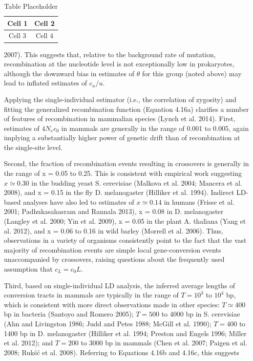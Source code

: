 \documentclass{article}
\begin{document}
\begin{table}[h]
\centering
\begin{tabular}{|c|c|}
\hline
Cell 1 & Cell 2 \\
\hline
Cell 3 & Cell 4 \\
\hline
\end{tabular}
\caption{Table Placeholder}
\end{table}

2007). This suggests that, relative to the background rate of mutation, recombination at the nucleotide level is not exceptionally low in prokaryotes, although the downward bias in estimates of  $ \theta $ for this group (noted above) may lead to inflated estimates of  $ c_n/u $.

Applying the single-individual estimator (i.e., the correlation of zygosity) and fitting the generalized recombination function (Equation 4.16a) clarifies a number of features of recombination in mammalian species (Lynch et al. 2014). First, estimates of  $ 4N_{e}c_{0} $ in mammals are generally in the range of 0.001 to 0.005, again implying a substantially higher power of genetic drift than of recombination at the single-site level.

Second, the fraction of recombination events resulting in crossovers is generally in the range of x = 0.05 to 0.25. This is consistent with empirical work suggesting  $ x \simeq 0.30 $ in the budding yeast S. cerevisiae (Malkova et al. 2004; Mancera et al. 2008), and x = 0.15 in the fly D. melanogaster (Hilliker et al. 1994). Indirect LD-based analyses have also led to estimates of  $ x \simeq 0.14 $ in humans (Frisse et al. 2001; Padhukasahasram and Rannala 2013), x = 0.08 in D. melanogaster (Langley et al. 2000; Yin et al. 2009), x = 0.05 in the plant A. thaliana (Yang et al. 2012), and x = 0.06 to 0.16 in wild barley (Morrell et al. 2006). Thus, observations in a variety of organisms consistently point to the fact that the vast majority of recombination events are simple local gene-conversion events unaccompanied by crossovers, raising questions about the frequently used assumption that  $ c_L = c_0 L $.

Third, based on single-individual LD analysis, the inferred average lengths of conversion tracts in mammals are typically in the range of  $ T = 10^{3} $ to  $ 10^{4} $ bp, which is consistent with more direct observations made in other species:  $ T \simeq 400 $ bp in bacteria (Santoyo and Romero 2005);  $ T = 500 $ to 4000 bp in S. cerevisiae (Ahn and Livingston 1986; Judd and Petes 1988; McGill et al. 1990);  $ T = 400 $ to 1400 bp in D. melanogaster (Hilliker et al. 1994; Preston and Engels 1996; Miller et al. 2012); and  $ T = 200 $ to 3000 bp in mammals (Chen et al. 2007; Paigen et al. 2008; Rukść et al. 2008). Referring to Equations 4.16b and 4.16c, this suggests
\end{document}
